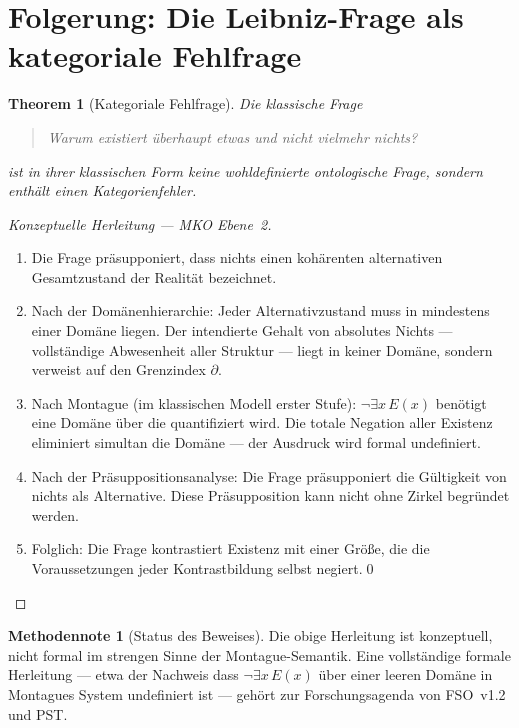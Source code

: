 \documentclass[11pt,a4paper]{article}
\theoremstyle{plain}
\newtheorem{theorem}{Theorem}[section]
\theoremstyle{definition}
\newtheorem{methodennote}{Methodennote}[section]
\begin{document}
\section{Folgerung: Die Leibniz-Frage als kategoriale Fehlfrage}

\begin{theorem}[Kategoriale Fehlfrage]
Die klassische Frage
\begin{quote}
\glqq{}Warum existiert \"{u}berhaupt etwas und nicht vielmehr nichts?\grqq{}
\end{quote}
ist in ihrer klassischen Form keine wohldefinierte ontologische Frage, sondern
enth\"{a}lt einen Kategorienfehler.
\end{theorem}

\begin{proof}[Konzeptuelle Herleitung --- MKO Ebene~2]
\begin{enumerate}
  \item Die Frage pr\"{a}supponiert, dass \glqq{}nichts\grqq{} einen koh\"{a}renten
        alternativen Gesamtzustand der Realit\"{a}t bezeichnet.
  \item Nach der Dom\"{a}nenhierarchie: Jeder Alternativzustand muss in mindestens
        einer Dom\"{a}ne liegen. Der intendierte Gehalt von \glqq{}absolutes Nichts\grqq{}
        --- vollst\"{a}ndige Abwesenheit aller Struktur --- liegt in keiner Dom\"{a}ne,
        sondern verweist auf den Grenzindex $\partial$.
  \item Nach Montague (im klassischen Modell erster Stufe): $\neg\exists x\, E(x)$
        ben\"{o}tigt eine Dom\"{a}ne \"{u}ber die quantifiziert wird. Die totale
        Negation aller Existenz eliminiert simultan die Dom\"{a}ne --- der Ausdruck
        wird formal undefiniert.
  \item Nach der Pr\"{a}suppositionsanalyse: Die Frage pr\"{a}supponiert die
        G\"{u}ltigkeit von \glqq{}nichts\grqq{} als Alternative. Diese Pr\"{a}supposition
        kann nicht ohne Zirkel begr\"{u}ndet werden.
  \item Folglich: Die Frage kontrastiert Existenz mit einer Gr\"{o}\ss{}e, die die
        Voraussetzungen jeder Kontrastbildung selbst negiert.\qed
\end{enumerate}
\end{proof}

\begin{methodennote}[Status des Beweises]
Die obige Herleitung ist konzeptuell, nicht formal im strengen Sinne der
Montague-Semantik. Eine vollst\"{a}ndige formale Herleitung --- etwa der Nachweis
dass $\neg\exists x\, E(x)$ \"{u}ber einer leeren Dom\"{a}ne in Montagues System
undefiniert ist --- geh\"{o}rt zur Forschungsagenda von FSO~v1.2 und PST.
\end{methodennote}
\end{document}
